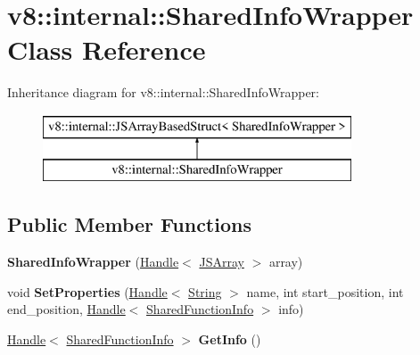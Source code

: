 \hypertarget{classv8_1_1internal_1_1_shared_info_wrapper}{}\section{v8\+:\+:internal\+:\+:Shared\+Info\+Wrapper Class Reference}
\label{classv8_1_1internal_1_1_shared_info_wrapper}
Inheritance diagram for v8\+:\+:internal\+:\+:Shared\+Info\+Wrapper\+:\begin{figure}[H]
\begin{center}
\leavevmode
\includegraphics[height=2.000000cm]{classv8_1_1internal_1_1_shared_info_wrapper}
\end{center}
\end{figure}
\subsection*{Public Member Functions}
\begin{DoxyCompactItemize}
\item 
{\bfseries Shared\+Info\+Wrapper} (\hyperlink{classv8_1_1internal_1_1_handle}{Handle}$<$ \hyperlink{classv8_1_1internal_1_1_j_s_array}{J\+S\+Array} $>$ array)\hypertarget{classv8_1_1internal_1_1_shared_info_wrapper_a10adf15f4c3fb2c00f4d0f91bf5ee1df}{}\label{classv8_1_1internal_1_1_shared_info_wrapper_a10adf15f4c3fb2c00f4d0f91bf5ee1df}

\item 
void {\bfseries Set\+Properties} (\hyperlink{classv8_1_1internal_1_1_handle}{Handle}$<$ \hyperlink{classv8_1_1internal_1_1_string}{String} $>$ name, int start\+\_\+position, int end\+\_\+position, \hyperlink{classv8_1_1internal_1_1_handle}{Handle}$<$ \hyperlink{classv8_1_1internal_1_1_shared_function_info}{Shared\+Function\+Info} $>$ info)\hypertarget{classv8_1_1internal_1_1_shared_info_wrapper_a6ec023bc94cfca9b08f39929bd119bd1}{}\label{classv8_1_1internal_1_1_shared_info_wrapper_a6ec023bc94cfca9b08f39929bd119bd1}

\item 
\hyperlink{classv8_1_1internal_1_1_handle}{Handle}$<$ \hyperlink{classv8_1_1internal_1_1_shared_function_info}{Shared\+Function\+Info} $>$ {\bfseries Get\+Info} ()\hypertarget{classv8_1_1internal_1_1_shared_info_wrapper_a1ffa193b4aca8e123f682a2b6001f012}{}\label{classv8_1_1internal_1_1_shared_info_wrapper_a1ffa193b4aca8e123f682a2b6001f012}

\end{DoxyCompactItemize}
